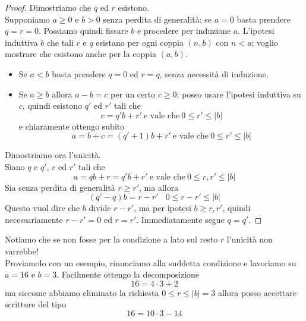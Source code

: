 \begin{proof}
	Dimostriamo che $q$ ed $r$ esistono. \\ Supponiamo $a\geq 0$ e $b>0$ senza perdita di generalità; se $a=0$ basta prendere $q=r=0$. Possiamo quindi fissare $b$ e procedere per induzione $a$. L'ipotesi induttiva è che tali $r$ e $q$ esistano per ogni coppia $(n,b)$ con $n<a$; voglio mostrare che esistono anche per la coppia $(a,b)$.
	\begin{itemize}
		\item Se $a<b$ basta prendere $q=0$ ed $r=q$, senza necessità di induzione.
		\item Se $a\geq b$ allora $a-b=c$ per un certo $c\geq 0$; posso usare l'ipotesi induttiva su $c$, quindi esistono $q'$ ed $r'$ tali che 
		\begin{equation*}
		c = q'b + r' \ \text{e vale che} \ 0 \leq r' \leq |b|
		\end{equation*}
		e chiaramente ottengo subito
		\begin{equation*}
		a = b+c = (q'+1)b + r' \ \text{e vale che} \ 0 \leq r' \leq |b|
		\end{equation*}
	\end{itemize}
	Dimostriamo ora l'unicità. \\
	Siano $q$ e $q'$, $r$ ed $r'$ tali che 
	\begin{equation*}
	a = qb + r= q'b + r'\ \text{e vale che} \ 0 \leq r,r' \leq |b|
	\end{equation*}
	Sia senza perdita di generalità $r \geq r'$, ma allora
	\begin{equation*}
	(q'-q)b=r-r' \ \ \ \ 0 \leq r-r' \leq |b|
	\end{equation*}
	Questo vuol dire che $b$ divide $r-r'$, ma per ipotesi $b\geq r,r'$,
	quindi necessariamente $r-r'=0$ ed $r=r'$. Immediatamente segue $q=q'$. 
\end{proof}
\begin{controesempio}
	Notiamo che se non fosse per la condizione a lato sul resto $r$ l'unicità non varrebbe! \\ Proviamolo con un esempio, rinunciamo alla suddetta condizione e lavoriamo su $a=16$ e $b=3$. Facilmente ottengo la decomposizione
	\begin{equation*}
	16 = 4\cdot3+2
	\end{equation*}
	ma siccome abbiamo eliminato la richiesta $0\leq r \leq |b|=3$ allora posso accettare scritture del tipo
	\begin{equation*}
	16=10\cdot3-14
	\end{equation*}
\end{controesempio}
